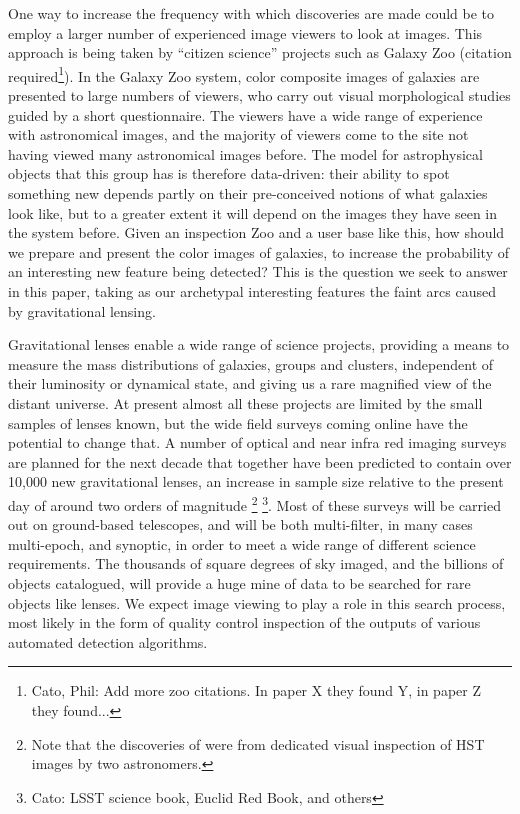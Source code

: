 \documentclass[letterpaper, 11pt]{article}
\def\HST{HST\xspace}
\begin{document}
One way to increase the frequency with which discoveries are made  could be to
employ a larger number of experienced image viewers to look at images.  This
approach is being taken by ``citizen science'' projects such as Galaxy Zoo
(citation required\footnote{Cato, Phil: Add more zoo citations. In paper X they
found Y, in paper Z they found...}). In the Galaxy Zoo system, color composite
images of galaxies are presented to large numbers of viewers, who carry out
visual morphological studies guided by a short questionnaire. The viewers have
a wide range of experience with astronomical images, and the majority of
viewers come to the site not having viewed many astronomical images before.
The model for astrophysical objects that this group has is therefore
data-driven: their ability to spot something new depends partly on their
pre-conceived notions of what galaxies look like, but to a greater extent it
will depend on the images they have seen in the system before. Given an
inspection Zoo and a user base like this,  how should we prepare and present
the color images of galaxies, to increase the probability of an interesting
new feature being detected? This is the question we seek to answer in this
paper, taking as our archetypal interesting features the faint arcs caused by
gravitational lensing. 

Gravitational lenses enable a wide range of science projects, providing a
means to measure the mass distributions of  galaxies, groups and clusters,
independent of their luminosity or dynamical state, and giving us a rare
magnified view of the distant universe. At present almost all these projects
are limited by the small samples of lenses known, but the wide field surveys
coming online have the potential to change that. A number of optical and near
infra red imaging surveys are planned for the next decade that together have
been predicted to contain over 10,000 new gravitational lenses, an increase in
sample size relative to the present day of around two orders of magnitude
\citep[e.g.][]{O+M10, Paw++12}\footnote{Note that the discoveries of \citet{Paw++12} were from dedicated visual inspection of \HST images by two astronomers.} \footnote{Cato: LSST science book, Euclid Red Book, and others}. Most of these
surveys will be carried out on ground-based telescopes, and will be both
multi-filter, in many cases multi-epoch, and synoptic, in order to meet a wide
range of different science requirements. The thousands of square degrees of
sky imaged, and the billions of objects catalogued, will provide a huge mine
of data to be searched for rare objects like lenses. We expect image viewing
to play a role in this search process, most likely in the form of quality
control inspection of the outputs of various automated detection algorithms.
\end{document}
